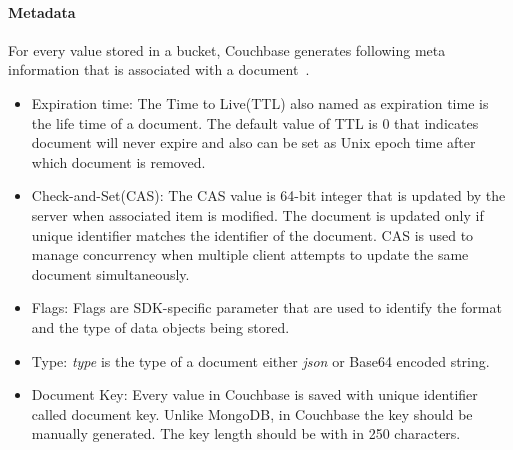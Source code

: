 \paragraph{Metadata}\label{cb-metadata}
For every value stored in a bucket, Couchbase generates following meta information that is associated with a document~\cite[p. 26]{cb/ostrovsky2014pro}. 
\begin{itemize}
	\item{Expiration time:}
		The Time to Live(TTL) also named as expiration time is the life time of a document. The default value of TTL is 0 that indicates document will never expire and also can be set as Unix epoch time after which document is removed.
	\item{Check-and-Set(CAS):}
		The CAS value is 64-bit integer that is updated by the server when associated item is modified. The document is updated only  if unique identifier matches the identifier of the document. CAS is used to manage concurrency when multiple client attempts to update the same document simultaneously. 
	\item{Flags:} 
Flags are SDK-specific parameter that are used to identify the format and the type of data objects being stored.
\item{Type:}
 \textit{type} is the type of a document either \textit{json} or Base64 encoded string.
 \item{Document Key:}
 Every value in Couchbase is saved with unique identifier called document key. Unlike MongoDB, in Couchbase the key should be manually generated. The key length should be with in 250 characters.
\end{itemize}	

